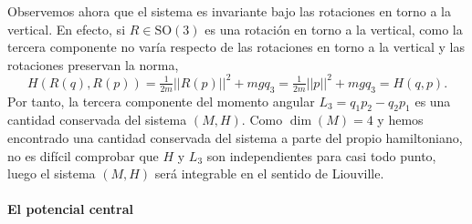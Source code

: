   Observemos ahora que el sistema es invariante bajo las rotaciones en torno a la vertical. En efecto, si $R\in\mathrm{SO}(3)$ es una rotación en torno a la vertical, como la tercera componente no varía respecto de las rotaciones en torno a la vertical y las rotaciones preservan la norma,
  \begin{equation*}
    H(R(q),R(p))=\tfrac{1}{2m}||R(p)||^2+mgq_3=\tfrac{1}{2m}||p||^2+mgq_3=H(q,p).
  \end{equation*}
  Por tanto, la tercera componente del momento angular $L_3=q_1p_2-q_2p_1$ es una cantidad conservada del sistema $(M,H)$. Como $\dim(M)=4$ y hemos encontrado una cantidad conservada del sistema a parte del propio hamiltoniano, no es difícil comprobar que $H$ y $L_3$ son independientes para casi todo punto, luego el sistema $(M,H)$ será integrable en el sentido de Liouville.

  \paragraph{\bf El potencial central}\mbox{}

